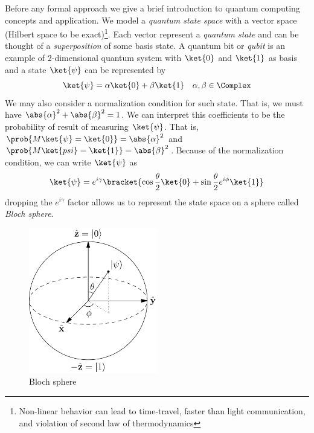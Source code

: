 Before any formal approach we give a brief introduction to quantum computing concepts and application. We model a \textit{quantum state space} with a vector space (Hilbert space to be exact)\footnote{Non-linear behavior can lead to time-travel, faster than light communication, and violation of second law of thermodynamics}. Each vector represent a \textit{quantum state} and can be thought of a \textit{superposition} of some basis state. A quantum bit or \textit{qubit} is an example of 2-dimensional quantum system with \(\ket{0}\) and \(\ket{1}\) as basis and a state \(\ket{\psi}\) can be represented by 
\begin{equation*}
    \ket{\psi} = \alpha \ket{0} + \beta \ket{1} \quad \alpha, \beta \in \Complex
\end{equation*}
We may also consider a normalization condition for such state. That is, we must have \(\abs{\alpha}^2 + \abs{\beta}^2 = 1\). We can interpret this coefficients to be the probability of result of measuring \(\ket{\psi}\). That is, \(\prob{M \ket{\psi} = \ket{0}} = \abs{\alpha}^2\) and \(\prob{M \ket{psi} = \ket{1}} = \abs{\beta}^2\). Because of the normalization condition, we can write \(\ket{\psi}\) as 
\begin{equation*}
    \ket{\psi} = e^{i\gamma} \bracket{\cos \dfrac{\theta}{2} \ket{0} + \sin \dfrac{\theta}{2} e^{i\phi} \ket{1}}
\end{equation*}
dropping the \(e^{i\gamma}\) factor allows us to represent the state space on a sphere called \textit{Bloch sphere}.
\begin{figure}
    \centering
    \includegraphics[width = 0.5\textwidth]{Chapters/Graphics/Bloch_Sphere.png}
    \caption{Bloch sphere}
\end{figure}

